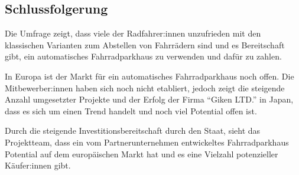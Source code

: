 \subsection{Schlussfolgerung}

Die Umfrage zeigt, dass viele der Radfahrer:innen unzufrieden mit den klassischen Varianten zum Abstellen von Fahrrädern sind und es Bereitschaft gibt, ein automatisches Fahrradparkhaus zu verwenden und dafür zu zahlen.

\noindent In Europa ist der Markt für ein automatisches Fahrradparkhaus noch offen. Die Mitbewerber:innen haben sich noch nicht etabliert, jedoch zeigt die steigende Anzahl umgesetzter Projekte und der Erfolg der Firma \enquote{Giken LTD.} in Japan, dass es sich um einen Trend handelt und noch viel Potential offen ist.

\noindent Durch die steigende Investitionsbereitschaft durch den Staat, sieht das Projektteam, dass ein vom Partnerunternehmen entwickeltes Fahrradparkhaus Potential auf dem europäischen Markt hat und es eine Vielzahl potenzieller Käufer:innen gibt.
